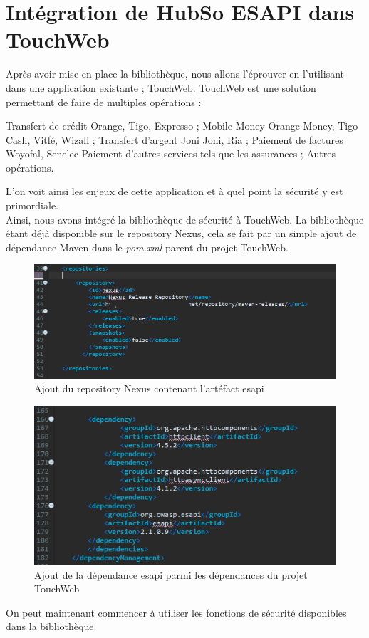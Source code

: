\section{Intégration de HubSo ESAPI dans TouchWeb}
Après avoir mise en place la bibliothèque, nous allons l'éprouver en l'utilisant dans une application existante ; TouchWeb. TouchWeb est une solution permettant de faire de multiples opérations :
\begin{itemize}
	\itemcheck Transfert de crédit Orange, Tigo, Expresso ;
	\itemcheck Mobile Money Orange Money, Tigo Cash, Vitfé, Wizall ;
	\itemcheck Transfert d'argent Joni Joni, Ria ;
	\itemcheck Paiement de factures Woyofal, Senelec
	\itemcheck Paiement d'autres services tels que les assurances ;
	\itemcheck Autres opérations.
\end{itemize}
L'on voit ainsi les enjeux de cette application et à quel point la sécurité y est primordiale.\\
Ainsi, nous avons intégré la bibliothèque de sécurité à TouchWeb. La bibliothèque étant déjà disponible sur le repository Nexus, cela se fait par un simple ajout de dépendance Maven dans le \textit{pom.xml} parent du projet TouchWeb.
\begin{figure}[H]
	\centering
	\begin{minipage}{12cm}
		\centering
		\includegraphics[width=1\textwidth]{fig/nexus-repository.png}
	\end{minipage}
	\caption{Ajout du repository Nexus contenant l'artéfact esapi}
	\label{fig:vccdfs}
\end{figure}
\begin{figure}[H]
	\centering
	\begin{minipage}{12cm}
		\centering
		\includegraphics[width=1\textwidth]{fig/esapi-dependency.PNG}
	\end{minipage}
	\caption{Ajout de la dépendance esapi parmi les dépendances du projet TouchWeb}
	\label{fig:vccdfs}
\end{figure}
On peut maintenant commencer à utiliser les fonctions de sécurité disponibles dans la bibliothèque.
